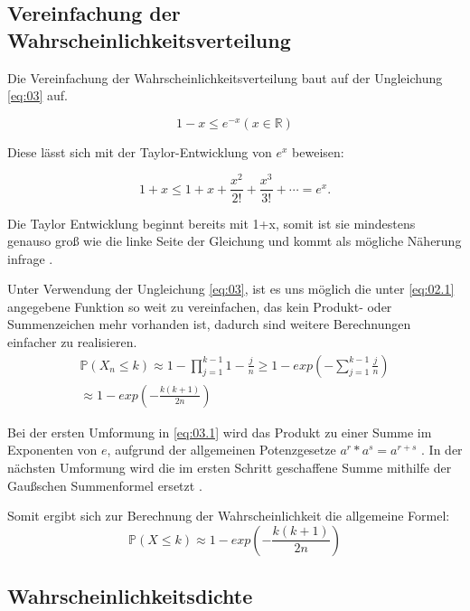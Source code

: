 \documentclass[../main.tex]{subfiles}
\begin{document}
\begin{flushleft}
\subsection{Vereinfachung der Wahrscheinlichkeitsverteilung}

Die Vereinfachung der Wahrscheinlichkeitsverteilung baut auf der Ungleichung \ref{eq:03} auf.

\begin{equation}
1 - x \leq e^{ -x } (x \in \mathbb{R}) \label{eq:03}
\end{equation}

Diese lässt sich mit der Taylor-Entwicklung von $e^x$ beweisen:

\begin{equation}
1 + x \leq 1 + x + \frac{x^2}{2!} + \frac{x^3}{3!} + \cdots = e^x.
\end{equation}

Die Taylor Entwicklung beginnt bereits mit 1+x, somit ist sie mindestens genauso groß wie die linke Seite der Gleichung und kommt als mögliche Näherung infrage \cite[560ff]{papula}. \newline

Unter Verwendung der Ungleichung \ref{eq:03}, ist es uns möglich die unter \ref{eq:02.1} angegebene Funktion so weit zu vereinfachen, das kein Produkt- oder Summenzeichen mehr vorhanden ist, dadurch sind weitere Berechnungen einfacher zu realisieren.
\begin{eqnarray}
\mathbb{P}(X_{ n } \leq k) \approx 1 - \prod_{ j = 1 }^{ k - 1 }{ 1 - \frac{ j }{ n } } \geq 1 - exp( - \sum_{ j = 1 }^{ k - 1 }{ \frac{ j }{ n } } )  \label{eq:03.1}\\
\approx 1 - exp( - \frac{ k (k + 1) }{ 2n } )  \label{eq:03.2}
\end{eqnarray}

Bei der ersten Umformung in \ref{eq:03.1} wird das Produkt zu einer Summe im Exponenten von $e$, aufgrund der allgemeinen Potenzgesetze  $a^{ r } * a^{ s } = a^{ r + s }$ \cite[267]{papula}. In der nächsten Umformung wird die im ersten Schritt geschaffene Summe mithilfe der Gaußschen Summenformel ersetzt \cite[9ff]{petkovsek1996b}. \newline

Somit ergibt sich zur Berechnung der Wahrscheinlichkeit die allgemeine Formel:
\begin{equation}
\mathbb{P}(X \leq k) \approx 1 - exp( - \frac{ k (k + 1) }{ 2n } ) \label{eq:04}
\end{equation}
\subsection{Wahrscheinlichkeitsdichte}


\end{flushleft}
\end{document}
